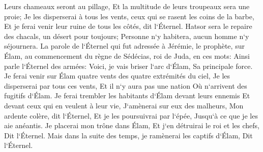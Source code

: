 \verse Leurs chameaux seront au pillage, Et la multitude de leurs troupeaux sera une proie; Je les disperserai à tous les vents, ceux qui se rasent les coins de la barbe, Et je ferai venir leur ruine de tous les côtés, dit l`Éternel. 
\verse Hatsor sera le repaire des chacals, un désert pour toujours; Personne n`y habitera, aucun homme n`y séjournera. 
\verse La parole de l`Éternel qui fut adressée à Jérémie, le prophète, sur Élam, au commencement du règne de Sédécias, roi de Juda, en ces mots: 
\verse Ainsi parle l`Éternel des armées: Voici, je vais briser l`arc d`Élam, Sa principale force. 
\verse Je ferai venir sur Élam quatre vents des quatre extrémités du ciel, Je les disperserai par tous ces vents, Et il n`y aura pas une nation Où n`arrivent des fugitifs d`Élam. 
\verse Je ferai trembler les habitants d`Élam devant leurs ennemis Et devant ceux qui en veulent à leur vie, J`amènerai sur eux des malheurs, Mon ardente colère, dit l`Éternel, Et je les poursuivrai par l`épée, Jusqu`à ce que je les aie anéantis. 
\verse Je placerai mon trône dans Élam, Et j`en détruirai le roi et les chefs, Dit l`Éternel. 
\verse Mais dans la suite des temps, je ramènerai les captifs d`Élam, Dit l`Éternel. 

